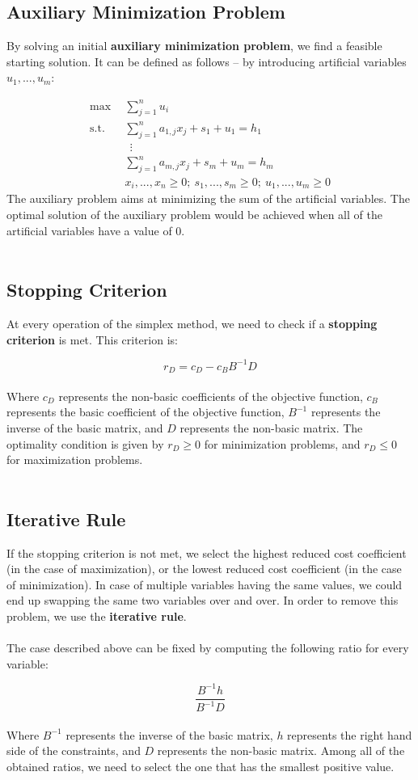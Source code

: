 \documentclass{article}
\begin{document}
\subsection{Auxiliary Minimization Problem}
By solving an initial \textbf{auxiliary minimization problem}, we find a feasible starting solution. It can be defined as follows -- by introducing artificial variables $u_1, ..., u_m$:

\begin{align*}
	\max~~ & \sum_{j = 1}^n u_i \\
	\text{s.t.}~~ & \sum_{j = 1}^n a_{1,j}x_j+s_1+u_1 = h_1 \\
	~~&~~ \vdots \\
	~~& \sum_{j = 1}^n a_{m,j}x_j+s_m+u_m = h_m \\
	~~& x_i, ..., x_n \geq 0;~ s_1, ..., s_m \geq 0;~ u_1, ..., u_m \geq 0
\end{align*}
The auxiliary problem aims at minimizing the sum of the artificial variables. The optimal solution of the auxiliary problem would be achieved when all of the artificial variables have a value of 0. \\ \\

\subsection{Stopping Criterion}
At every operation of the simplex method, we need to check if a \textbf{stopping criterion} is met. This criterion is:

\[ r_D = c_D - c_BB^{-1}D \] \\
Where $c_D$ represents the non-basic coefficients of the objective function, $c_B$ represents the basic coefficient of the objective function, $B^{-1}$ represents the inverse of the basic matrix, and $D$ represents the non-basic matrix. The optimality condition is given by $r_D \geq 0$ for minimization problems, and $r_D \leq 0$ for maximization problems. \\ \\

\subsection{Iterative Rule}
If the stopping criterion is not met, we select the highest reduced cost coefficient (in the case of maximization), or the lowest reduced cost coefficient (in the case of minimization). In case of multiple variables having the same values, we could end up swapping the same two variables over and over. In order to remove this problem, we use the \textbf{iterative rule}. \\ \\
The case described above can be fixed by computing the following ratio for every variable:

\[ \frac{B^{-1}h}{B^{-1}D} \] \\
Where $B^{-1}$ represents the inverse of the basic matrix, $h$ represents the right hand side of the constraints, and $D$ represents the non-basic matrix. Among all of the obtained ratios, we need to select the one that has the smallest positive value.
\end{document}
